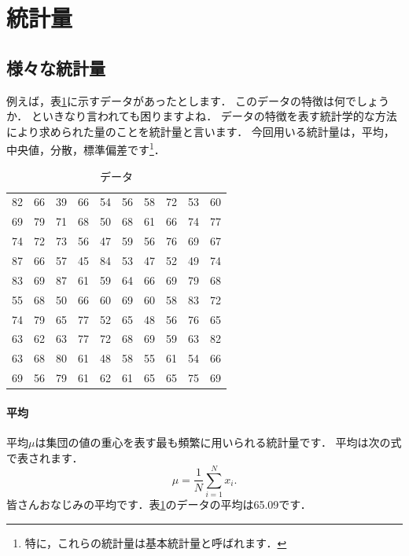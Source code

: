 \section{統計量}

\subsection{様々な統計量}

例えば，表\ref{tab:sample}に示すデータがあったとします．
このデータの特徴は何でしょうか．
といきなり言われても困りますよね．
データの特徴を表す統計学的な方法により求められた量のことを統計量と言います．
今回用いる統計量は，平均，中央値，分散，標準偏差です\footnote{特に，これらの統計量は基本統計量と呼ばれます．}．

\begin{table}[tb]
    \caption{データ}
    \centering
    \begin{tabular}{cccccccccc}
       82 & 66 & 39 & 66 & 54 & 56 & 58 & 72 & 53 & 60 \\
       69 & 79 & 71 & 68 & 50 & 68 & 61 & 66 & 74 & 77 \\
       74 & 72 & 73 & 56 & 47 & 59 & 56 & 76 & 69 & 67 \\
       87 & 66 & 57 & 45 & 84 & 53 & 47 & 52 & 49 & 74 \\
       83 & 69 & 87 & 61 & 59 & 64 & 66 & 69 & 79 & 68 \\
       55 & 68 & 50 & 66 & 60 & 69 & 60 & 58 & 83 & 72 \\
       74 & 79 & 65 & 77 & 52 & 65 & 48 & 56 & 76 & 65 \\
       63 & 62 & 63 & 77 & 72 & 68 & 69 & 59 & 63 & 82 \\
       63 & 68 & 80 & 61 & 48 & 58 & 55 & 61 & 54 & 66 \\
       69 & 56 & 79 & 61 & 62 & 61 & 65 & 65 & 75 & 69 \\
    \end{tabular}
    \label{tab:sample}
\end{table}

\paragraph{平均}
平均$\mu$は集団の値の重心を表す最も頻繁に用いられる統計量です．
平均は次の式で表されます．
\begin{equation}
    \mu = \frac{1}{N} \sum_{i=1}^{N} x_i.
\end{equation}
皆さんおなじみの平均です．表\ref{tab:sample}のデータの平均は65.09です．



